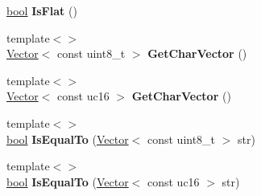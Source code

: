 \begin{DoxyCompactItemize}
\item 
\mbox{\label{classv8_1_1internal_1_1String_a67b81848ea2df3c46e3ff2af9148317e}} 
\mbox{\hyperlink{classbool}{bool}} {\bfseries Is\+Flat} ()
\item 
\mbox{\label{classv8_1_1internal_1_1String_af90602b3513fcaa54e649c8cd6e29c1f}} 
{\footnotesize template$<$$>$ }\\\mbox{\hyperlink{classv8_1_1internal_1_1Vector}{Vector}}$<$ const uint8\+\_\+t $>$ {\bfseries Get\+Char\+Vector} ()
\item 
\mbox{\label{classv8_1_1internal_1_1String_a70e84382368531b08cf06d3f0e13b266}} 
{\footnotesize template$<$$>$ }\\\mbox{\hyperlink{classv8_1_1internal_1_1Vector}{Vector}}$<$ const uc16 $>$ {\bfseries Get\+Char\+Vector} ()
\item 
\mbox{\label{classv8_1_1internal_1_1String_a5f7f4c569017ef423693a6ca80a37b02}} 
{\footnotesize template$<$$>$ }\\\mbox{\hyperlink{classbool}{bool}} {\bfseries Is\+Equal\+To} (\mbox{\hyperlink{classv8_1_1internal_1_1Vector}{Vector}}$<$ const uint8\+\_\+t $>$ str)
\item 
\mbox{\label{classv8_1_1internal_1_1String_a437470455d2a49adcba5977175cae2e1}} 
{\footnotesize template$<$$>$ }\\\mbox{\hyperlink{classbool}{bool}} {\bfseries Is\+Equal\+To} (\mbox{\hyperlink{classv8_1_1internal_1_1Vector}{Vector}}$<$ const uc16 $>$ str)
\end{DoxyCompactItemize}
